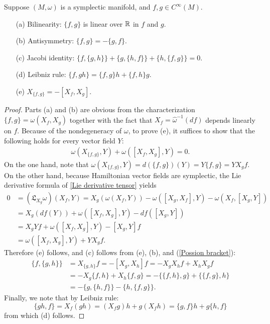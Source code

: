 \begin{proposition}
Suppose $(M,\omega)$ is a symplectic manifold, and $f,g\in C^\infty(M)$.
\begin{enumerate}
\item[(a)] Bilinearity: $\{f,g\}$ is linear over $\mathbb{R}$ in $f$ and $g$.
\item[(b)] Antisymmetry: $\{f,g\}=-\{g,f\}$.
\item[(c)] Jacobi identity: $\{f,\{g,h\}\}+\{g,\{h,f\}\}+\{h,\{f,g\}\}=0$.
\item[(d)] Leibniz rule: $\{f,gh\}=\{f,g\}h+\{f,h\}g$.
\item[(e)] $X_{\{f,g\}}=-[X_f,X_g]$.   
\end{enumerate}
\end{proposition}
\begin{proof}
Parts (a) and (b) are obvious from the characterization $\{f,g\}=\omega(X_f,X_g)$ together with the fact that $X_f=\widehat{\omega}^{-1}(df)$ depends linearly on $f$. Because of the nondegeneracy of $\omega$, to prove (e), it suffices to show that the following holds for every vector field $Y$:
\begin{align}\label{Possion bracket prop-1}
\omega(X_{\{f,g\}},Y)+\omega([X_f,X_g],Y)=0.
\end{align}
On the one hand, note that $\omega(X_{\{f,g\}},Y)=d(\{f,g\})(Y)=Y\{f,g\}=YX_gf$. On the other hand, because Hamiltonian vector fields are symplectic, the Lie derivative formula of \cref{Lie derivative tensor} yields
\begin{align*}
0&=(\mathfrak{L}_{X_g}\omega)(X_f,Y)=X_g(\omega(X_f,Y))-\omega([X_g,X_f],Y)-\omega(X_f,[X_g,Y])\\
&=X_g(df(Y))+\omega([X_f,X_g],Y)-df([X_g,Y])\\
&=X_gYf+\omega([X_f,X_g],Y)-[X_g,Y]f\\
&=\omega([X_f,X_g],Y)+YX_gf.
\end{align*}
Therefore (e) follows, and (c) follows from (e), (b), and (\ref{Possion bracket}):
\begin{align*}
\{f,\{g,h\}\}&=X_{\{g,h\}}f=-[X_g,X_h]f=-X_gX_hf+X_hX_gf\\
&=-X_g\{f,h\}+X_h\{f,g\}=-\{\{f,h\},g\}+\{\{f,g\},h\}\\
&=-\{g,\{h,f\}\}-\{h,\{f,g\}\}.
\end{align*}
Finally, we note that by Leibniz rule:
\[\{gh,f\}=X_f(gh)=(X_fg)h+g(X_fh)=\{g,f\}h+g\{h,f\}\]
from which (d) follows.
\end{proof}

